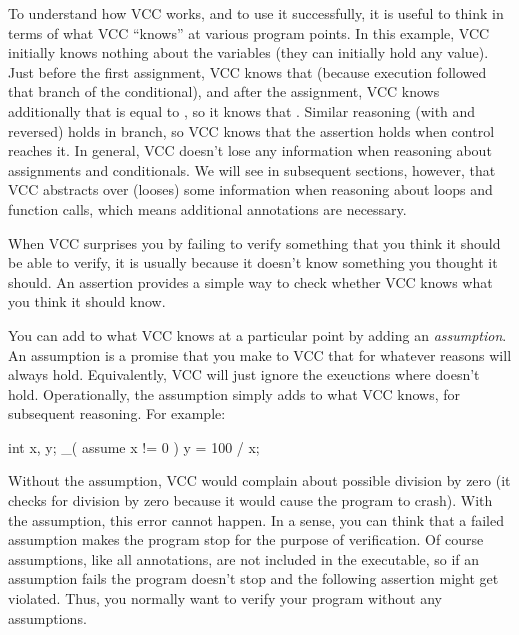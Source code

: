 To understand how VCC works, and to use it successfully, it is useful to
think in terms of what VCC ``knows'' at various program points. In
this example, VCC initially knows nothing about the variables (they
can initially hold any value). Just before the first assignment, VCC knows that 
 (because execution followed that branch of the conditional), and
after the assignment, VCC knows additionally that  is equal to
, so it knows that . Similar reasoning
(with  and  reversed) holds in  branch, so VCC
knows that the assertion holds when control reaches it. In general,
VCC doesn't lose any information when reasoning about assignments and
conditionals. We will see in subsequent sections, however, that VCC
abstracts over (looses) some information when reasoning about loops and function calls,
which means additional annotations are necessary.

When VCC surprises you by failing to verify something that you think
it should be able to verify, it is usually because it doesn't know
something you thought it should. An assertion provides a simple way to
check whether VCC knows what you think it should know.

You can add to what VCC knows at a particular point by adding an
\emph{assumption}.
An assumption  is a promise that you make to VCC
that for whatever reasons  will always hold.
Equivalently, VCC will just ignore the exeuctions where  doesn't hold.
Operationally, the assumption simply adds  to what VCC
knows, for subsequent reasoning. For example:
\begin{VCC}
int x, y;
_( assume x != 0 )
y = 100 / x;
\end{VCC}
Without the assumption, VCC would complain about possible division by
zero (it checks for division by zero because it would cause the
program to crash).  With the assumption, this error cannot happen.
In a sense, you can think that a failed assumption makes the program
stop for the purpose of verification.
Of course assumptions, like all annotations, are not included in the executable, so
if an assumption fails the program doesn't stop and the following assertion might get violated.
Thus, you normally want to verify your program without any assumptions.

